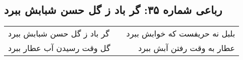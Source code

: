 \begin{center}
\section*{رباعی شماره ۳۵: گر باد ز گل حسن شبابش ببرد}
\label{sec:035}
\begin{longtable}{l p{0.5cm} r}
گر باد ز گل حسن شبابش ببرد
&&
بلبل نه حریفست که خوابش ببرد
\\
گل وقت رسیدن آب عطار ببرد
&&
عطار به وقت رفتن آبش ببرد
\\
\end{longtable}
\end{center}
